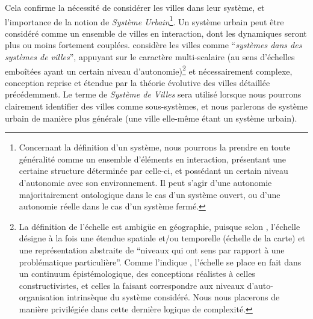 {Cela confirme la nécessité de considérer les villes dans leur système, et l'importance de la notion de \emph{Système Urbain}\footnote{Concernant la définition d'un système, nous pourrons la prendre en toute généralité comme un ensemble d'éléments en interaction, présentant une certaine structure déterminée par celle-ci, et possédant un certain niveau d'autonomie avec son environnement. Il peut s'agir d'une autonomie majoritairement ontologique dans le cas d'un système ouvert, ou d'une autonomie réelle dans le cas d'un système fermé.}. Un système urbain peut être considéré comme un ensemble de villes en interaction, dont les dynamiques seront plus ou moins fortement couplées. \cite{berry1964cities} considère les villes comme ``\textit{systèmes dans des systèmes de villes}'', appuyant sur le caractère multi-scalaire (au sens d'échelles emboîtées ayant un certain niveau d'autonomie)\footnote{La définition de l'échelle est ambigüe en géographie, puisque selon \cite{hypergeo}, l'échelle désigne à la fois une étendue spatiale et/ou temporelle (échelle de la carte) et une représentation abstraite de ``niveaux qui ont sens par rapport à une problématique particulière''. Comme l'indique \cite{manson2008does}, l'échelle se place en fait dans un continuum épistémologique, des conceptions réalistes à celles constructivistes, et celles la faisant correspondre aux niveaux d'auto-organisation intrinsèque du système considéré. Nous nous placerons de manière privilégiée dans cette dernière logique de complexité.} et nécessairement complexe, conception reprise et étendue par la théorie évolutive des villes détaillée précédemment. Le terme de \emph{Système de Villes} sera utilisé lorsque nous pourrons clairement identifier des villes comme sous-systèmes, et nous parlerons de système urbain de manière plus générale (une ville elle-même étant un système urbain).
}


